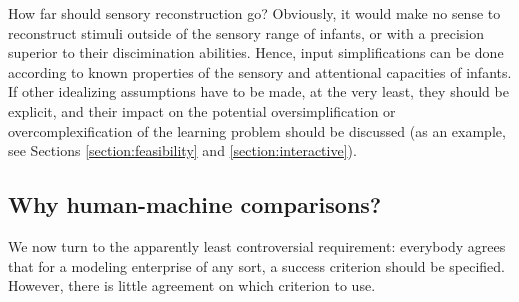 \documentclass[jou,apacite]{apa6}
\begin{document}
How far should sensory reconstruction go? Obviously, it would make no sense to reconstruct stimuli outside of the sensory range of infants, or with a precision superior to their discimination abilities. Hence, input simplifications can be done according to known properties of the sensory and attentional capacities of infants. If other idealizing assumptions have to be made, at the very least, they should be explicit, and their impact on the potential oversimplification or overcomplexification of the learning problem should be discussed (as an example, see Sections \ref{section:feasibility} and \ref{section:interactive}). 
















\subsection{Why human-machine comparisons?}\label{section:eval}

We now turn to the apparently least controversial requirement: everybody agrees that for a modeling enterprise of any sort, a success criterion should be specified.  However, there is little agreement on which criterion to use. %
\end{document}
